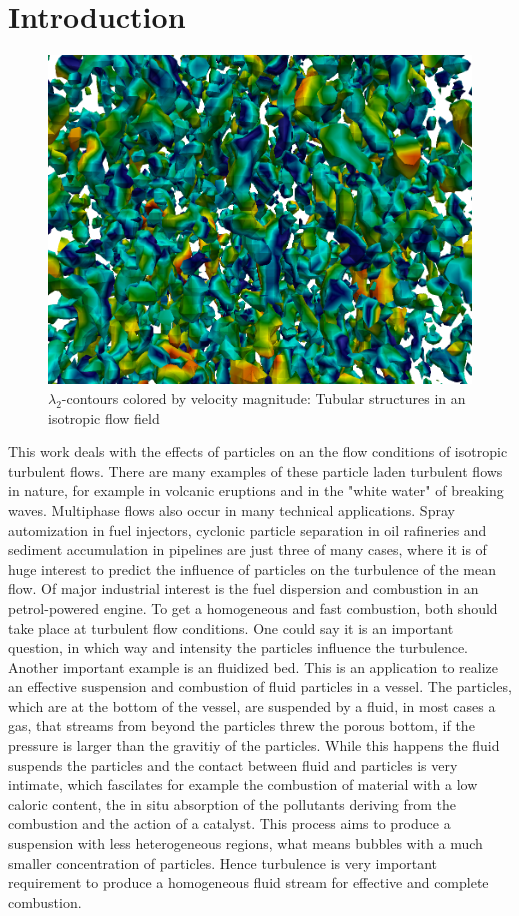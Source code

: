 \documentclass[11pt,a4paper,openany,oneside,parskip=half*]{article}
\begin{document}
\section{Introduction}
\begin{figure}[h]
	\centering
  \includegraphics[width=\textwidth]{./Abbildungen/64_velocity.png}
	\caption{$\lambda_\mathrm{2}$-contours colored by velocity magnitude: Tubular structures in an isotropic flow field}
	\label{introuction_picture}
\end{figure}
This work deals with the effects of particles on an the flow conditions of isotropic turbulent flows.
There are many examples of these particle laden turbulent flows in nature, for example in volcanic eruptions and in the "white water" of breaking waves.
\newline
Multiphase flows also occur in many technical applications. Spray automization in fuel injectors, cyclonic particle separation in oil rafineries and sediment accumulation in pipelines are just three of many cases, where it is of huge interest to predict the influence of particles on the turbulence of the mean flow.
Of major industrial interest is the fuel dispersion and combustion in an petrol-powered engine. To get a homogeneous and fast combustion, both should take place at turbulent flow conditions. One could say it is an important question, in which way and intensity the particles influence the turbulence.
\newline
Another important example is an fluidized bed. This is an application to realize an effective suspension and combustion of fluid particles in a vessel. The particles, which are at the bottom of the vessel, are suspended by a fluid, in most cases a gas, that streams from beyond the particles threw the porous bottom, if the pressure is larger than the gravitiy of the particles. While this happens the fluid suspends the particles and the contact between fluid and particles is very intimate, which fascilates for example the combustion of material with a low caloric content, the in situ absorption of the pollutants deriving from the combustion and the action of a catalyst. This process aims to produce a suspension with less heterogeneous regions, what means bubbles with a much smaller concentration of particles. Hence turbulence is very important requirement to produce a homogeneous fluid stream for effective and complete combustion.
\end{document}
